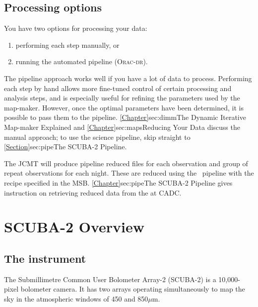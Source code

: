 \documentclass[11pt,oneside,chapters]{starlink}
\begin{document}
\section{Processing options}

You have two options for processing your data:

\begin{enumerate}
\item performing each step manually, or
\item running the automated pipeline (\textsc{Orac-dr}).
\end{enumerate}

The pipeline approach works well if you have a lot of data to process.
Performing each step by hand allows more fine-tuned control of certain
processing and analysis steps, and is especially useful for refining
the parameters used by the map-maker. However, once the optimal
parameters have been determined, it is possible to pass them to the
pipeline. \cref{Chapter}{sec:dimm}{The Dynamic Iterative Map-maker
  Explained} and \cref{Chapter}{sec:maps}{Reducing Your Data} discuss
the manual approach; to use the science pipeline, skip straight to
\cref{Section}{sec:pipe}{The SCUBA-2 Pipeline}.

The JCMT will produce pipeline reduced files for each observation and
group of repeat observations for each night. These are reduced using
the \oracdr\ pipeline with the recipe specified in the MSB.
\cref{Chapter}{sec:pipe}{The SCUBA-2 Pipeline} gives instruction on
retrieving reduced data from the  at
CADC.



\chapter{SCUBA-2 Overview}
\label{sec:s2}
\section{The instrument}


The Submillimetre Common User Bolometer Array-2 (SCUBA-2) is a
10,000-pixel bolometer camera. It has two arrays operating
simultaneously to map the sky in the atmospheric windows of 450 and
850$\mu$m.
\end{document}
